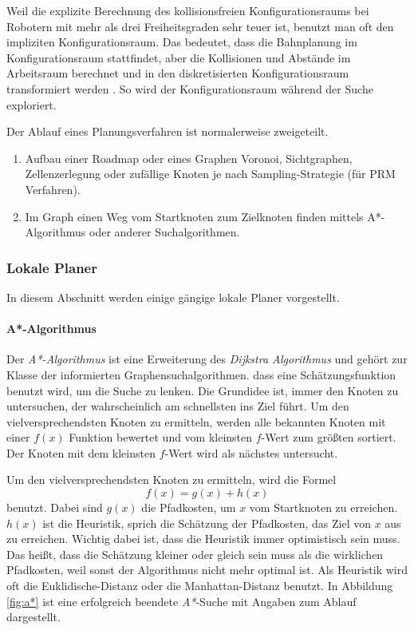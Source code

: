Weil die explizite Berechnung des kollisionsfreien Konfigurationsraums bei Robotern mit mehr als drei Freiheitsgraden sehr teuer ist, benutzt man oft den impliziten Konfigurationsraum.
Das bedeutet, dass die Bahnplanung im Konfigurationsraum stattfindet, aber die Kollisionen und Abstände im Arbeitsraum berechnet und in den diskretisierten Konfigurationsraum transformiert werden \citep{innoKonz}.
So wird der Konfigurationsraum während der Suche exploriert.

Der Ablauf eines Planungsverfahren ist normalerweise zweigeteilt\cite{Russell2003}.
\begin{enumerate}
	\item Aufbau einer Roadmap oder eines Graphen \gls{Voronoi}, \gls{Sichtgraphen}, \gls{Zellenzerlegung} oder zufällige Knoten je nach
 Sampling-Strategie (\zB für \gls{PRM} Verfahren\cite{Thrun2005}).
	\item Im Graph einen Weg vom Startknoten zum Zielknoten finden mittels A*-Algorithmus oder anderer Suchalgorithmen.
\end{enumerate}

\subsubsection{Lokale Planer}
\label{bahnplanung_lokale_planer_sec}

In diesem Abschnitt werden einige gängige lokale Planer vorgestellt.

\paragraph{A*-Algorithmus} 

Der \textit{A*-Algorithmus} \citep{Russell2003} ist eine Erweiterung des \textit{Dijkstra Algorithmus} und gehört zur Klasse der informierten Graphensuchalgorithmen.
\Dh dass eine Schätzungsfunktion benutzt wird, um die Suche zu lenken.
Die Grundidee ist, immer den Knoten zu untersuchen, der wahrscheinlich am schnellsten ins Ziel führt.
Um den vielversprechendsten Knoten zu ermitteln, werden alle bekannten Knoten mit einer $f(x)$ Funktion bewertet und vom kleinsten $f$-Wert zum größten sortiert.
Der Knoten mit dem kleinsten $f$-Wert wird als nächstes untersucht. 

Um den vielversprechendsten Knoten zu ermitteln, wird die Formel
\begin{equation}
 f(x) = g(x) + h(x)
\end{equation}
benutzt.
Dabei sind $g(x)$ die Pfadkosten, um $x$ vom Startknoten zu erreichen.
$h(x)$ ist die Heuristik, sprich die Schätzung der Pfadkosten, das Ziel von $x$ aus zu erreichen.
Wichtig dabei ist, dass die Heuristik immer optimistisch sein muss.
Das heißt, dass die Schätzung kleiner oder gleich sein muss als die wirklichen Pfadkosten, weil sonst der Algorithmus nicht mehr optimal ist.
Als Heuristik wird oft die \gls{Euklidische-Distanz} oder die \gls{Manhattan-Distanz} benutzt.
In Abbildung \ref{fig:a*} ist eine erfolgreich beendete \textit{A*}-Suche mit Angaben zum Ablauf dargestellt.

